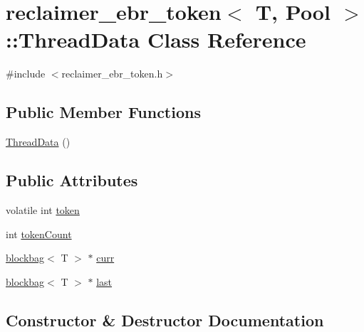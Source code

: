 \hypertarget{classreclaimer__ebr__token_1_1ThreadData}{}\section{reclaimer\+\_\+ebr\+\_\+token$<$ T, Pool $>$\+:\+:Thread\+Data Class Reference}
\label{classreclaimer__ebr__token_1_1ThreadData}


{\ttfamily \#include $<$reclaimer\+\_\+ebr\+\_\+token.\+h$>$}

\subsection*{Public Member Functions}
\begin{DoxyCompactItemize}
\item 
\hyperlink{classreclaimer__ebr__token_1_1ThreadData_a2198c46887f5f955760f2488baa162e7}{Thread\+Data} ()
\end{DoxyCompactItemize}
\subsection*{Public Attributes}
\begin{DoxyCompactItemize}
\item 
volatile int \hyperlink{classreclaimer__ebr__token_1_1ThreadData_a4b6b47b02cb3e120d4fb9fa8820e5b4d}{token}
\item 
int \hyperlink{classreclaimer__ebr__token_1_1ThreadData_aef3ca8bfcf65b876744855d00f19d482}{token\+Count}
\item 
\hyperlink{classblockbag}{blockbag}$<$ T $>$ $\ast$ \hyperlink{classreclaimer__ebr__token_1_1ThreadData_affa120c770d3a6fb2b3fae1e3c5559ed}{curr}
\item 
\hyperlink{classblockbag}{blockbag}$<$ T $>$ $\ast$ \hyperlink{classreclaimer__ebr__token_1_1ThreadData_a26b4385b902f289bdc1235b7eff1c877}{last}
\end{DoxyCompactItemize}


\subsection{Constructor \& Destructor Documentation}
\mbox{\label{classreclaimer__ebr__token_1_1ThreadData_a2198c46887f5f955760f2488baa162e7}} 
